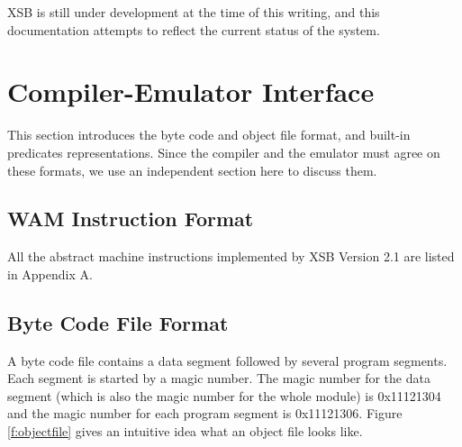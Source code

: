 \documentclass[11pt]{article}
\newcommand{\version}{Version 2.1}
\begin{document}
XSB is still under development at the time of this writing, and
this documentation attempts to reflect the current status of the system.






\section{Compiler-Emulator Interface} \label{sec:comp-emu}

This section introduces the byte code and object file format, and
built-in predicates representations. Since the compiler and
the emulator must agree on these formats, we use an independent
section here to discuss them.

\subsection{WAM Instruction Format}

All the abstract machine instructions
implemented by XSB \version \mbox{} are listed in Appendix A.


\subsection{Byte Code File Format}

A byte code file contains a data segment followed by several program
segments. Each segment is started by a magic number. The magic number
for the data segment (which is also the magic number for the whole
module) is 0x11121304 and the magic number for each program segment
is 0x11121306. Figure \ref{f:objectfile} gives an intuitive idea
what an object file looks like.
\end{document}
